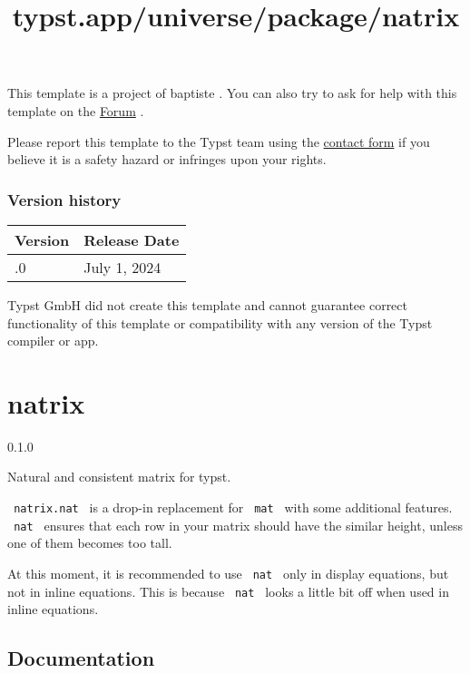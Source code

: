 This template is a project of baptiste . You can also try to ask for
help with this template on the \href{https://forum.typst.app}{Forum} .

Please report this template to the Typst team using the
\href{https://typst.app/contact}{contact form} if you believe it is a
safety hazard or infringes upon your rights.

\label{versions}
\subsubsection{Version history}\label{version-history}

\begin{longtable}[]{@{}ll@{}}
\toprule\noalign{}
Version & Release Date \\
\midrule\noalign{}
\endhead
\bottomrule\noalign{}
\endlastfoot
0.1.0 & July 1, 2024 \\
\end{longtable}

Typst GmbH did not create this template and cannot guarantee correct
functionality of this template or compatibility with any version of the
Typst compiler or app.


\title{typst.app/universe/package/natrix}

\label{banner}
\section{natrix}\label{natrix}

{ 0.1.0 }

Natural and consistent matrix for typst.

\label{readme}
\pandocbounded{}

\texttt{\ natrix.nat\ } is a drop-in replacement for \texttt{\ mat\ }
with some additional features. \texttt{\ nat\ } ensures that each row in
your matrix should have the similar height, unless one of them becomes
too tall.

At this moment, it is recommended to use \texttt{\ nat\ } only in
display equations, but not in inline equations. This is because
\texttt{\ nat\ } looks a little bit off when used in inline equations.

\subsection{Documentation}\label{documentation}

